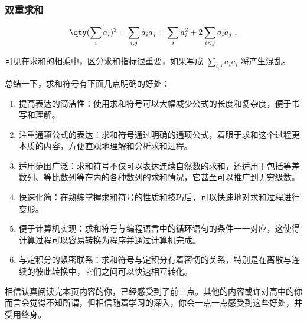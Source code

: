 \subsubsection{双重求和}
\begin{equation}
\qty(\sum_i a_i)^2 = \sum_{i,j} a_i a_j = \sum_i a_i^2 + 2\sum_{i<j} a_i a_j~.
\end{equation}

可见在求和的相乘中，区分求和指标很重要，如果写成 $\sum\limits_{i,i} a_i a_i$ 将产生混乱。

总结一下，求和符号有下面几点明确的好处：

\begin{enumerate}
\item 提高表达的简洁性：使用求和符号可以大幅减少公式的长度和复杂度，便于书写和理解。
\item 注重通项公式的表达：求和符号通过明确的通项公式，着眼于求和这个过程更本质的内容，方便直观地理解和分析求和过程。
\item 适用范围广泛：求和符号不仅可以表达连续自然数的求和，还适用于包括等差数列、等比数列等在内的各种数列的求和情况，它甚至可以推广到无穷级数。
\item 快速化简：在熟练掌握求和符号的性质和技巧后，可以快速地对求和过程进行变形。
\item 便于计算机实现：求和符号与编程语言中的循环语句的条件一一对应，这使得计算过程可以容易转换为程序并通过计算机完成。
\item 与定积分的紧密联系：求和符号与定积分有着密切的关系，特别是在离散与连续的彼此转换中，它们之间可以快速相互转化。
\end{enumerate}

相信认真阅读完本页内容的你，已经感受到了前三点。其他的内容或许对高中的你而言会觉得不知所谓，但相信随着学习的深入，你会一点一点感受到这些好处，并受用终身。
